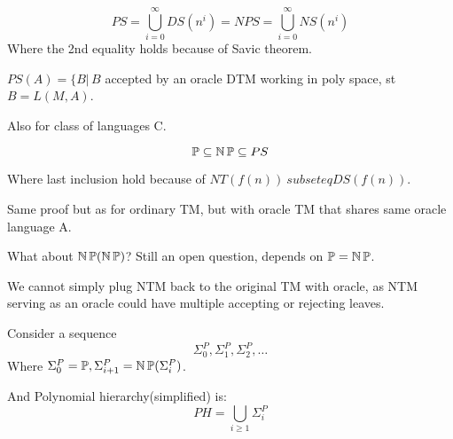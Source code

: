 \begin{definition}
	\[ PS = \bigcup_{i = 0}^{\infty} DS(n^i) = NPS = \bigcup_{i = 0}^{\infty} NS(n^i) \]
	Where the 2nd equality holds because of Savic theorem.
\end{definition}

\begin{definition}
	$PS(A) = \{ B | \, B$ accepted by an oracle DTM working in poly space, st $B = L(M, A)$.

	Also for class of languages C.
\end{definition}

\begin{note}
	\[ \operatorname{\mathbb{P}} \subseteq \operatorname{\operatorname{\mathbb{N}}\mathbb{P}} \subseteq PS \]

	Where last inclusion hold because of $NT(f(n)) \ subseteq DS(f(n))$.

	Same proof but as for ordinary TM, but with oracle TM that shares same oracle language A.
\end{note}

\begin{observation}
	What about $\operatorname{\operatorname{\mathbb{N}}\mathbb{P}}(\operatorname{\operatorname{\mathbb{N}}\mathbb{P}})$? Still an open question, depends on $\operatorname{\mathbb{P}} = \operatorname{\operatorname{\mathbb{N}}\mathbb{P}}$.

	We cannot simply plug NTM back to the original TM with oracle, as NTM serving as an oracle could have multiple accepting or rejecting leaves.
\end{observation}

\begin{definition}
	Consider a sequence
	\[ \Sigma_0^P, \Sigma_1^P, \Sigma_2^P, \ldots \]
	Where $\Sigma_0^P = \operatorname{\mathbb{P}}, \Sigma_{i + 1}^P = \operatorname{\operatorname{\mathbb{N}}\mathbb{P}}(\Sigma_i^P)$.

	And Polynomial hierarchy(simplified) is:
	\[ PH = \bigcup_{i \geq 1} \Sigma_i^P \]
\end{definition}

